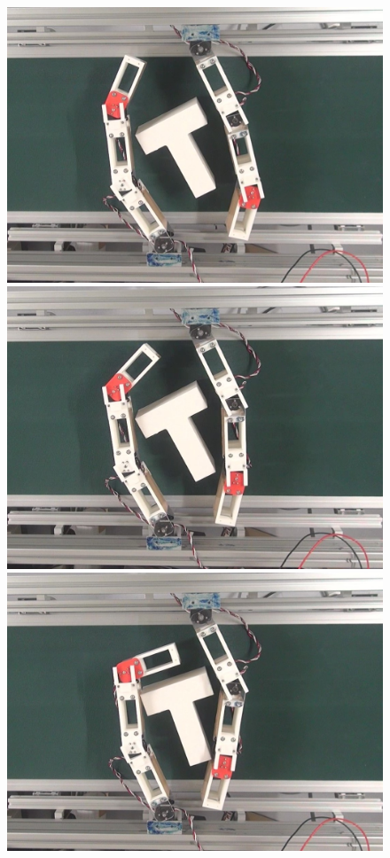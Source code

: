 \documentclass[a4paper,papersize,dvipdfmx]{mtabst}
\begin{document}
\begin{figure}[t]
\begin{minipage}{0.249\linewidth}
\centering
\includegraphics[width=0.9\linewidth]{fig/4-manipulation-result/TShape/1-1.jpg}
\end{minipage}\hfill
\begin{minipage}{0.249\linewidth}
\centering
\includegraphics[width=0.9\linewidth]{fig/4-manipulation-result/TShape/1-2.jpg}
\end{minipage}\hfill
\begin{minipage}{0.249\linewidth}
\centering
\includegraphics[width=0.9\linewidth]{fig/4-manipulation-result/TShape/1-3.jpg}

\end{minipage}
\end{figure}
\end{document}
